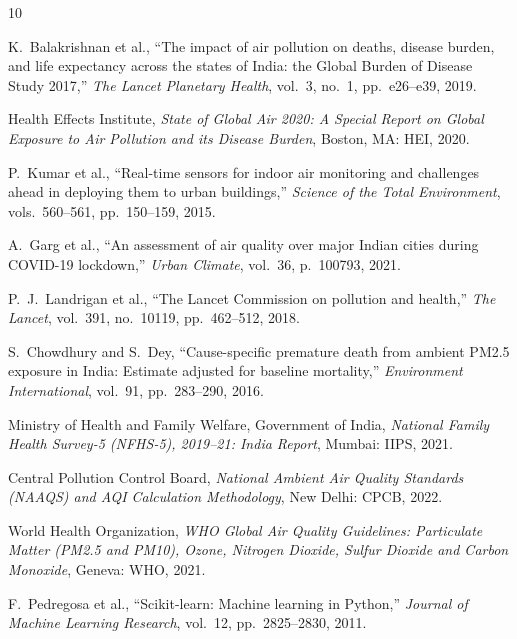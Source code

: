 \documentclass[10pt, conference]{IEEEtran}
\begin{document}
\balance


\begin{thebibliography}{10}

K.~Balakrishnan et al.,
``The impact of air pollution on deaths, disease burden, and
life expectancy across the states of India: the Global Burden
of Disease Study 2017,''
\textit{The Lancet Planetary Health}, vol.~3, no.~1,
pp.~e26--e39, 2019.

Health Effects Institute,
\textit{State of Global Air 2020: A Special Report on Global
Exposure to Air Pollution and its Disease Burden},
Boston, MA: HEI, 2020.

P.~Kumar et al.,
``Real-time sensors for indoor air monitoring and challenges
ahead in deploying them to urban buildings,''
\textit{Science of the Total Environment},
vols.~560--561, pp.~150--159, 2015.

A.~Garg et al.,
``An assessment of air quality over major Indian cities
during COVID-19 lockdown,''
\textit{Urban Climate}, vol.~36, p.~100793, 2021.

P.~J.~Landrigan et al.,
``The Lancet Commission on pollution and health,''
\textit{The Lancet}, vol.~391, no.~10119,
pp.~462--512, 2018.

S.~Chowdhury and S.~Dey,
``Cause-specific premature death from ambient PM2.5 exposure
in India: Estimate adjusted for baseline mortality,''
\textit{Environment International}, vol.~91,
pp.~283--290, 2016.

Ministry of Health and Family Welfare, Government of India,
\textit{National Family Health Survey-5 (NFHS-5), 2019--21:
India Report},
Mumbai: IIPS, 2021.

Central Pollution Control Board,
\textit{National Ambient Air Quality Standards (NAAQS) and
AQI Calculation Methodology},
New Delhi: CPCB, 2022.

World Health Organization,
\textit{WHO Global Air Quality Guidelines: Particulate Matter
(PM2.5 and PM10), Ozone, Nitrogen Dioxide, Sulfur Dioxide
and Carbon Monoxide},
Geneva: WHO, 2021.

F.~Pedregosa et al.,
``Scikit-learn: Machine learning in Python,''
\textit{Journal of Machine Learning Research}, vol.~12,
pp.~2825--2830, 2011.

\end{thebibliography}
\end{document}
